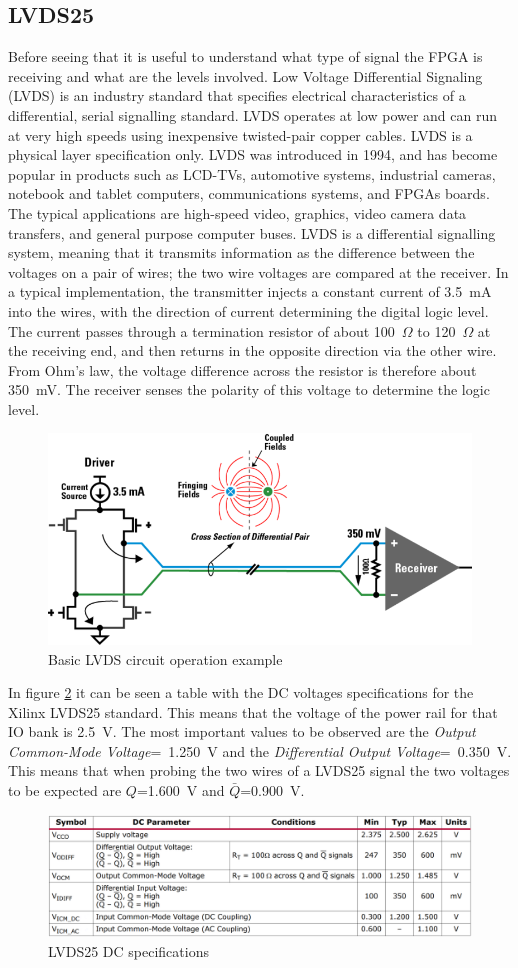 \subsection{LVDS25}
Before seeing that it is useful to understand what type of signal the FPGA is receiving and what are the levels involved.
Low Voltage Differential Signaling\cite{lvds} (LVDS) is an industry standard that specifies electrical characteristics of a differential, serial signalling standard.
LVDS operates at low power and can run at very high speeds using inexpensive twisted-pair copper cables. LVDS is a physical layer specification only.
LVDS was introduced in 1994, and has become popular in products such as LCD-TVs, automotive systems, industrial cameras, notebook and tablet computers, communications systems, and FPGAs boards. The typical applications are high-speed video, graphics, video camera data transfers, and general purpose computer buses.
LVDS is a differential signalling system, meaning that it transmits information as the difference between the voltages on a pair of wires; the two wire voltages are compared at the receiver.
In a typical implementation, the transmitter injects a constant current of 3.5~mA into the wires, with the direction of current determining the digital logic level. The current passes through a termination resistor of about 100~$\Omega$ to 120~$\Omega$ at the receiving end, and then returns in the opposite direction via the other wire. From Ohm's law, the voltage difference across the resistor is therefore about 350~mV. The receiver senses the polarity of this voltage to determine the logic level.
\begin{figure}[H]
	\centering
	\includegraphics[width=0.5\linewidth]{IMG/ch3/LVDS}
	\caption{Basic LVDS circuit operation example}
	\label{fig:lvds}
\end{figure}
\noindent In figure \ref{fig:lvds25} it can be seen a table with the DC voltages specifications for the Xilinx LVDS25 standard. This means that the voltage of the power rail for that IO bank is 2.5~V. The most important values to be observed are the \textit{Output Common-Mode Voltage}=~1.250~V and the \textit{Differential Output Voltage}=~0.350~V. This means that when probing the two wires of a LVDS25 signal the two voltages to be expected are $Q$=1.600~V and $\bar{Q}$=0.900~V.
\begin{figure}[H]
	\centering
	\includegraphics[width=0.8\linewidth]{IMG/ch3/LVDS25SPEC}
	\caption{LVDS25 DC specifications}
	\label{fig:lvds25}
\end{figure}
